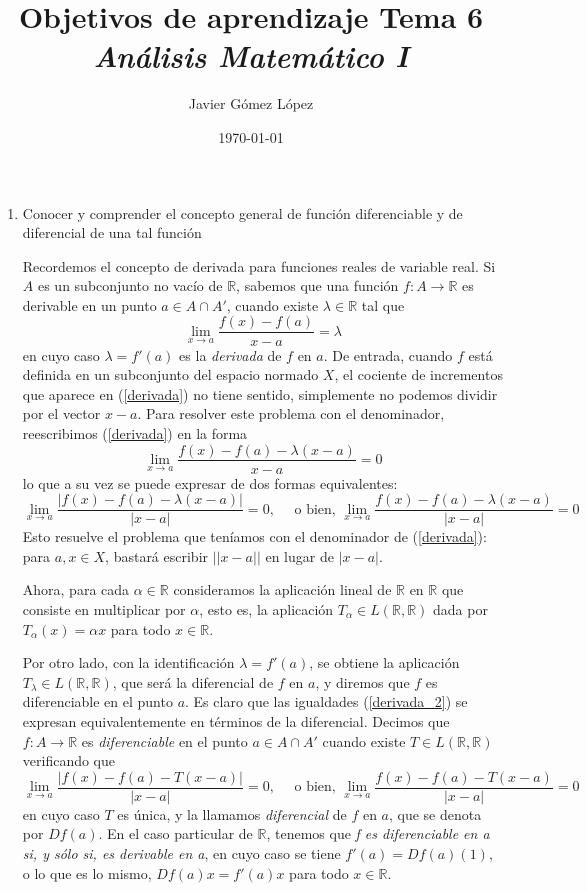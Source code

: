 \documentclass[a4paper, 12pt]{article}
\title{\textbf{Objetivos de aprendizaje Tema 6} \\ \textit{Análisis Matemático I}}
\author{Javier Gómez López}
\date{\today}
\begin{document}
\maketitle

\begin{enumerate}[label=\textbf{\arabic*}.]

\item Conocer y comprender el concepto general de función diferenciable y de diferencial de una tal función

Recordemos el concepto de derivada para funciones reales de variable real. Si \(A\) es un subconjunto no vacío de \(\mathbb{R}\), sabemos que una función \(f: A \rightarrow \mathbb{R}\) es derivable en un punto \(a \in A \cap A'\), cuando existe \(\lambda \in \mathbb{R}\) tal que
\begin{equation}\label{derivada}
	\lim_{x \to a} \frac{f(x)-f(a)}{x-a} = \lambda
\end{equation}
en cuyo caso \(\lambda = f'(a)\) es la \textit{derivada} de \(f\) en \(a\). De entrada, cuando \(f\) está definida en un subconjunto del espacio normado \(X\), el cociente de incrementos que aparece en (\ref{derivada}) no tiene sentido, simplemente no podemos dividir por el vector \(x-a\). Para resolver este problema con el denominador, reescribimos (\ref{derivada}) en la forma
\[
	\lim_{x \to a} \frac{f(x)-f(a)-\lambda (x-a)}{x-a} = 0
\]
lo que a su vez se puede expresar de dos formas equivalentes:
\begin{equation}\label{derivada_2}
	\lim_{x \to a} \frac{| f(x) - f(a) - \lambda (x-a)|}{|x-a|} = 0, \quad \text{ o bien, } \lim_{x \to a} \frac{f(x) - f(a) - \lambda (x-a)}{|x-a|} = 0
\end{equation}
Esto resuelve el problema que teníamos con el denominador de (\ref{derivada}): para \(a,x \in X\), bastará escribir \(||x-a||\) en lugar de \(|x-a|\). 

Ahora, para cada \(\alpha \in \mathbb{R}\) consideramos la aplicación lineal de \(\mathbb{R}\) en \(\mathbb{R}\) que consiste en multiplicar por \(\alpha\), esto es, la aplicación \(T_\alpha \in L(\mathbb{R},\mathbb{R})\) dada por \(T_\alpha(x) = \alpha x\) para todo \(x \in \mathbb{R}\).

Por otro lado, con la identificación \(\lambda = f'(a)\), se obtiene la aplicación \(T_\lambda \in L(\mathbb{R},\mathbb{R})\), que será la diferencial de \(f\) en \(a\), y diremos que \(f\) es diferenciable en el punto \(a\). Es claro que las igualdades (\ref{derivada_2}) se expresan equivalentemente en términos de la diferencial. Decimos que \(f: A \to \mathbb{R}\) es \textit{diferenciable} en el punto \(a \in A \cap A'\) cuando existe \(T \in L(\mathbb{R},\mathbb{R})\) verificando que 
\[
	\lim_{x \to a} \frac{|f(x) -f(a) - T(x-a)|}{|x-a|} = 0, \quad \text{ o bien, } \lim_{x \to a} \frac{f(x) - f(a) - T(x-a)}{|x-a|} = 0
\]
en cuyo caso \(T\) es única, y la llamamos \textit{diferencial} de \(f\) en \(a\), que se denota por \(D f(a)\). En el caso particular de \(\mathbb{R}\), tenemos que \textit{f es diferenciable en a si, y sólo si, es derivable en a}, en cuyo caso se tiene \(f'(a) = Df(a) (1)\), o lo que es lo mismo, \(D f(a) x = f'(a) x\) para todo \(x \in \mathbb{R}\).


\end{enumerate}
\end{document}

